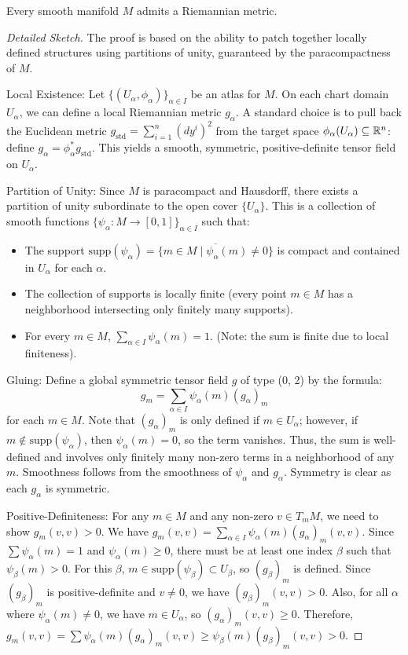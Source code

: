 \begin{theorem}
Every smooth manifold $M$ admits a Riemannian metric.
\end{theorem}

\begin{proof}[Detailed Sketch]
The proof is based on the ability to patch together locally defined structures using partitions of unity, guaranteed by the paracompactness of $M$.

Local Existence: Let $\{ (U_\alpha, \phi_\alpha) \}_{\alpha \in I}$ be an atlas for $M$. On each chart domain $U_\alpha$, we can define a local Riemannian metric $g_\alpha$. A standard choice is to pull back the Euclidean metric $g_{\text{std}} = \sum_{i=1}^n (dy^i)^2$ from the target space $\phi_\alpha(U_\alpha) \subseteq \mathbb{R}^n$: define $g_\alpha = \phi_\alpha^* g_{\text{std}}$. This yields a smooth, symmetric, positive-definite tensor field on $U_\alpha$.

Partition of Unity: Since $M$ is paracompact and Hausdorff, there exists a partition of unity subordinate to the open cover $\{U_\alpha\}$. This is a collection of smooth functions $\{\psi_\alpha: M \to [0, 1]\}_{\alpha \in I}$ such that:
\begin{itemize}
    \item The support $\text{supp}(\psi_\alpha) = \overline{\{m \in M \mid \psi_\alpha(m) \neq 0\}}$ is compact and contained in $U_\alpha$ for each $\alpha$.
    \item The collection of supports is locally finite (every point $m \in M$ has a neighborhood intersecting only finitely many supports).
    \item For every $m \in M$, $\sum_{\alpha \in I} \psi_\alpha(m) = 1$. (Note: the sum is finite due to local finiteness).
\end{itemize}

Gluing: Define a global symmetric tensor field $g$ of type (0, 2) by the formula:
    \[ g_m = \sum_{\alpha \in I} \psi_\alpha(m) (g_\alpha)_m \]
    for each $m \in M$. Note that $(g_\alpha)_m$ is only defined if $m \in U_\alpha$; however, if $m \notin \text{supp}(\psi_\alpha)$, then $\psi_\alpha(m) = 0$, so the term vanishes. Thus, the sum is well-defined and involves only finitely many non-zero terms in a neighborhood of any $m$. Smoothness follows from the smoothness of $\psi_\alpha$ and $g_\alpha$. Symmetry is clear as each $g_\alpha$ is symmetric.

Positive-Definiteness: For any $m \in M$ and any non-zero $v \in T_m M$, we need to show $g_m(v, v) > 0$. We have $g_m(v, v) = \sum_{\alpha \in I} \psi_\alpha(m) (g_\alpha)_m(v, v)$. Since $\sum \psi_\alpha(m) = 1$ and $\psi_\alpha(m) \ge 0$, there must be at least one index $\beta$ such that $\psi_\beta(m) > 0$. For this $\beta$, $m \in \text{supp}(\psi_\beta) \subset U_\beta$, so $(g_\beta)_m$ is defined. Since $(g_\beta)_m$ is positive-definite and $v \neq 0$, we have $(g_\beta)_m(v, v) > 0$. Also, for all $\alpha$ where $\psi_\alpha(m) \neq 0$, we have $m \in U_\alpha$, so $(g_\alpha)_m(v, v) \ge 0$. Therefore, $g_m(v, v) = \sum \psi_\alpha(m) (g_\alpha)_m(v, v) \ge \psi_\beta(m) (g_\beta)_m(v, v) > 0$.

\end{proof}

